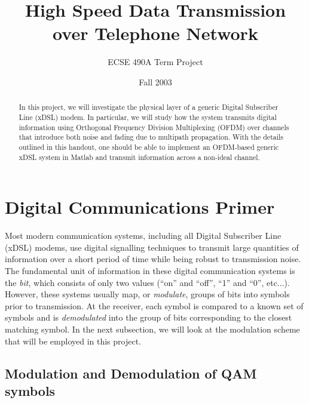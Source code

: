 \documentclass[12pt]{article}
\begin{document}
\title{High Speed Data Transmission over Telephone Network}
\author{ECSE 490A Term Project}
\date{Fall 2003}
\maketitle

\begin{abstract}
In this project, we will investigate the physical layer of a
generic Digital Subscriber Line (xDSL) modem. In particular, we
will study how the system transmits digital information using
Orthogonal Frequency Division Multiplexing (OFDM) over channels
that introduce both noise and fading due to multipath propagation.
With the details outlined in this handout, one should be able to
implement an OFDM-based generic xDSL system in Matlab and transmit
information across a non-ideal channel.
\end{abstract}


\section{Digital Communications Primer}

Most modern communication systems, including all Digital
Subscriber Line (xDSL) modems, use digital signalling techniques
to transmit large quantities of information over a short period of
time while being robust to transmission noise. The fundamental
unit of information in these digital communication systems is the
{\it bit}, which consists of only two values (``on'' and ``off'',
``1'' and ``0'', etc...). However, these systems usually map, or
{\it modulate}, groups of bits into symbols prior to transmission.
At the receiver, each symbol is compared to a known set of symbols
and is {\it demodulated} into the group of bits corresponding to
the closest matching symbol. In the next subsection, we will look
at the modulation scheme that will be employed in this project.


\subsection{Modulation and Demodulation of QAM symbols}
\end{document}
